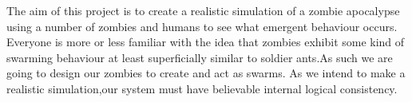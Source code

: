\pagestyle{empty}
The aim of this project is to create a realistic simulation of a zombie apocalypse using a number of zombies and humans to see what emergent behaviour occurs.
Everyone is more or less familiar with the idea that zombies exhibit some kind of swarming behaviour at least superficially similar to soldier ants.As such we are going to design our zombies to create and act as swarms.
As we intend to make a realistic simulation,our system must have believable internal logical consistency.
\clearpage
\endinput
